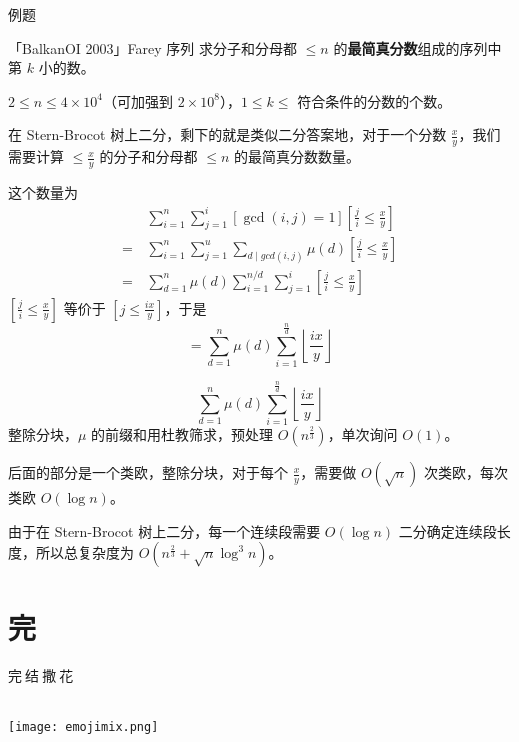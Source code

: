 \documentclass[UTF8]{beamer}
\begin{document}
    \begin{frame}{例题}
        \begin{block}{「BalkanOI 2003」Farey 序列}
        求分子和分母都 $\leq n$ 的\textbf{最简真分数}组成的序列中第 $k$ 小的数。

        $2 \leq n \leq 4 \times 10^4$（可加强到 $2\times 10^8$），$1 \leq k \leq$ 符合条件的分数的个数。
        \end{block}
        \pause
        在 Stern-Brocot 树上二分，剩下的就是类似二分答案地，对于一个分数 $\frac{x}{y}$，我们需要计算 $\le \frac{x}{y}$ 的分子和分母都 $\leq n$ 的最简真分数数量。
    \end{frame}

    \begin{frame}
        这个数量为
        $$
        \begin{aligned}
            &\sum_{i=1}^n\sum_{j=1}^i[\gcd(i,j) = 1]\left[\frac ji\le \frac xy\right]\\
            =\,& \sum_{i=1}^n\sum_{j=1}^u\sum_{d\mid gcd(i,j)}\mu(d)\left[\frac ji\le \frac xy\right]\\
            =\,& \sum_{d=1}^n\mu(d)\sum_{i=1}^{n/d}\sum_{j=1}^i\left[\frac ji\le \frac xy\right]
        \end{aligned}
        $$
        $\left[\frac ji\le \frac xy\right]$ 等价于 $\left[j\le \frac{ix}{y}\right]$，于是
        $$
        =\sum_{d=1}^n\mu(d)\sum_{i=1}^{\frac{n}{d}}\left\lfloor\frac{ix}{y}\right\rfloor
        $$
    \end{frame}

    \begin{frame}
        $$
        \sum_{d=1}^n\mu(d)\sum_{i=1}^{\frac{n}{d}}\left\lfloor\frac{ix}{y}\right\rfloor
        $$
        整除分块，$\mu$ 的前缀和用杜教筛求，预处理 $O(n^{\frac 23})$，单次询问 $O(1)$。

        后面的部分是一个类欧，整除分块，对于每个 $\frac{x}{y}$，需要做 $O(\sqrt n)$ 次类欧，每次类欧 $O(\log n)$。

        由于在 Stern-Brocot 树上二分，每一个连续段需要 $O(\log n)$ 二分确定连续段长度，所以总复杂度为 $O(n^{\frac 23}+\sqrt n\log^3n)$。
    \end{frame}

    \section{完}
	\begin{frame}
		\begin{center}
			\begin{Huge}
				完$\ $结$\ $撒$\ $花\\
			\end{Huge}
			\ \\
			\texttt{[image: emojimix.png]}
		\end{center}
	\end{frame}
\end{document}
